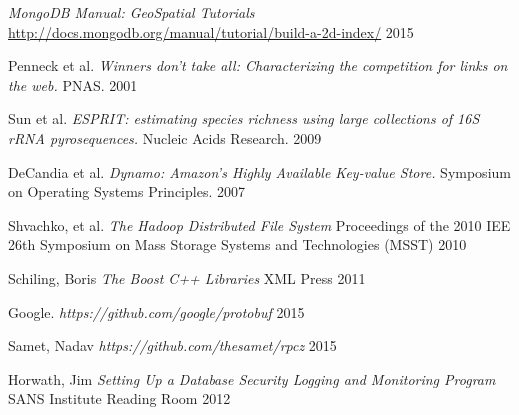 \documentclass[11pt]{article}
\begin{document}
\begin{thebibliography}{99}
  \emph{MongoDB Manual: GeoSpatial Tutorials}
  \url{http://docs.mongodb.org/manual/tutorial/build-a-2d-index/}
  2015

  Penneck et al.
  \emph{Winners don't take all: Characterizing the competition for links on the web.}
  PNAS.
  2001

  Sun et al.
  \emph{ESPRIT: estimating species richness using large collections of 16S rRNA pyrosequences.}
  Nucleic Acids Research.
  2009


  DeCandia et al.
  \emph{Dynamo: Amazon’s Highly Available Key-value Store.}
  Symposium on Operating Systems Principles.
  2007

Shvachko, et al.
\emph{The Hadoop Distributed File System}
Proceedings of the 2010 IEE 26th Symposium on Mass Storage Systems and Technologies (MSST)
2010

Schiling, Boris
\emph{The Boost C++ Libraries}
XML Press
2011

Google.
\emph{https://github.com/google/protobuf}
2015

Samet, Nadav
\emph{https://github.com/thesamet/rpcz}
2015

Horwath, Jim
\emph{Setting Up a Database Security Logging and Monitoring Program}
SANS Institute Reading Room
2012

\end{thebibliography}
\end{document}
